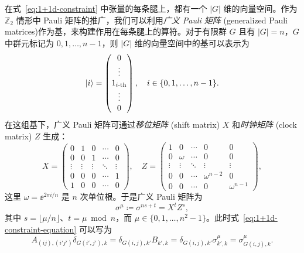 在式~\eqref{eq:1+1d-constraint} 中张量的每条腿上，都有一个 $|G|$ 维的向量空间。作为 $\mathbb{Z}_2$ 情形中 Pauli 矩阵的推广，我们可以利用\emph{广义 Pauli 矩阵} (generalized Pauli matrices)\cite{patera1988pauli}作为基，来构建作用在每条腿上的算符。对于有限群 $G$ 且有 $|G|=n$，$G$ 中群元标记为 $0, 1, \dots, n-1$，则 $|G|$ 维的向量空间中的基可以表示为
\begin{equation}
  \ket{i} = \begin{pmatrix} 0 \\ \vdots \\ 1_{\text{$i$-th}} \\ \vdots \\ 0 \end{pmatrix}, \quad
  i \in \{ 0, 1, \dots, n-1 \}.
\end{equation}
在这组基下，广义 Pauli 矩阵可通过\emph{移位矩阵} (shift matrix) $X$ 和\emph{时钟矩阵} (clock matrix) $Z$ 生成：
\begin{equation}
  X = \begin{pmatrix}
    0      & 1      & 0      & \cdots & 0      \\
    0      & 0      & 1      & \cdots & 0      \\
    \vdots & \vdots & \vdots & \ddots & \vdots \\
    0      & 0      & 0      & \cdots & 1      \\
    1      & 0      & 0      & \cdots & 0
  \end{pmatrix}, \quad
  Z = \begin{pmatrix}
    1      & 0      & \cdots & 0            & 0      \\
    0      & \omega & \cdots & 0            & 0      \\
    \vdots & \vdots & \ddots & \vdots       & \vdots \\
    0      & 0      & \cdots & \omega^{n-2} & 0      \\
    0      & 0      & \cdots & 0            &\omega^{n-1}
  \end{pmatrix},
  \label{eq:generalized-pauli-matrices}
\end{equation}
这里 $\omega=\ee^{2\pi i/n}$ 是 $n$ 次单位根。于是广义 Pauli 矩阵为
\begin{equation}
  \sigma^\mu \coloneq \sigma^{ns+t} = X^t Z^s,
\end{equation}
其中 $s=\lfloor \mu/n\rfloor$、$t=\mu\bmod n$，而 $\mu\in\{0,1,\dots,n^2-1\}$。此时式~\eqref{eq:1+1d-constraint-equation} 可以写为
\begin{equation}
    A_{(ij), (i'j')} \delta_{G(i',j'), k}
  = \delta_{G(i,j), k'} B_{k', k}
  = \delta_{G(i,j), k'} \sigma^\mu_{k', k}
  = \sigma^\mu_{G(i,j), k}.
\end{equation}
